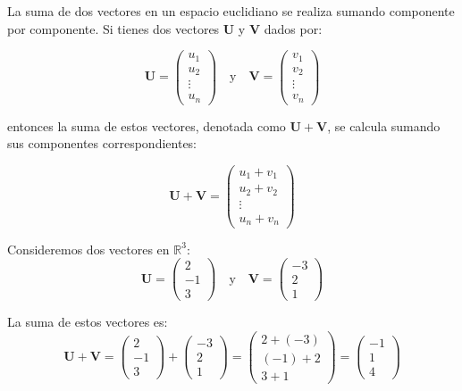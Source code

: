 \begin{example}
   La suma de dos vectores en un espacio euclidiano se realiza sumando componente por componente. Si tienes dos vectores $\mathbf{U}$ y $\mathbf{V}$ dados por:

\[
\boldsymbol{U} = \begin{pmatrix} u_1 \\ u_2 \\ \vdots \\ u_n \end{pmatrix} \quad \text{y} \quad \boldsymbol{V} = \begin{pmatrix} v_1 \\ v_2 \\ \vdots \\ v_n \end{pmatrix}
\]

entonces la suma de estos vectores, denotada como $\mathbf{U} + \mathbf{V}$, se calcula sumando sus componentes correspondientes:

\[
\boldsymbol{U} + \boldsymbol{V} = \begin{pmatrix} u_1 + v_1 \\ u_2 + v_2 \\ \vdots \\ u_n + v_n \end{pmatrix}
\]
\end{example}
\begin{example}
    Consideremos dos vectores en \( \mathbb{R}^3 \):
\[
\boldsymbol{U} = \begin{pmatrix} 2 \\ -1 \\ 3 \end{pmatrix} \quad \text{y} \quad \boldsymbol{V} = \begin{pmatrix} -3 \\ 2 \\ 1 \end{pmatrix}
\]

La suma de estos vectores es:
\[
\boldsymbol{U} + \boldsymbol{V} = \begin{pmatrix} 2 \\ -1 \\ 3 \end{pmatrix} + \begin{pmatrix} -3 \\ 2 \\ 1 \end{pmatrix} = \begin{pmatrix} 2 + (-3) \\ (-1) + 2 \\ 3 + 1 \end{pmatrix} = \begin{pmatrix} -1 \\ 1 \\ 4 \end{pmatrix}
\]
\end{example}

